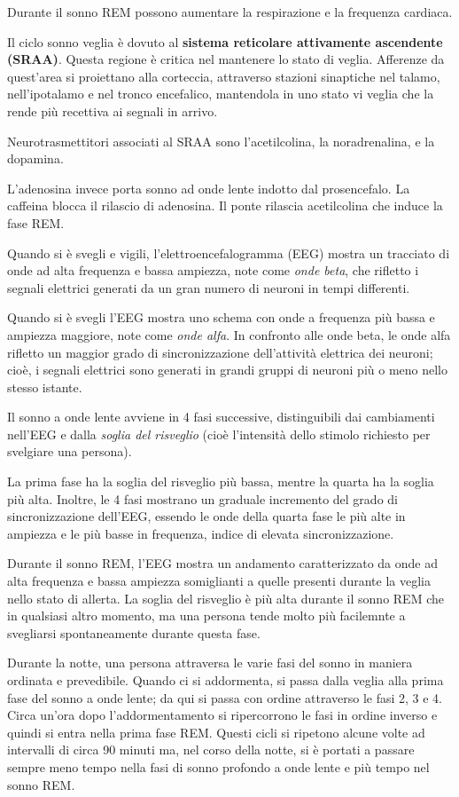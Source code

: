 \documentclass[]{article}
\begin{document}
Durante il sonno REM possono aumentare la respirazione e la frequenza
cardiaca.

Il ciclo sonno veglia è dovuto al \textbf{sistema reticolare attivamente
ascendente (SRAA)}. Questa regione è critica nel mantenere lo stato di
veglia. Afferenze da quest'area si proiettano alla corteccia, attraverso
stazioni sinaptiche nel talamo, nell'ipotalamo e nel tronco encefalico,
mantendola in uno stato vi veglia che la rende più recettiva ai segnali
in arrivo.

Neurotrasmettitori associati al SRAA sono l'acetilcolina, la
noradrenalina, e la dopamina.

L'adenosina invece porta sonno ad onde lente indotto dal prosencefalo.
La caffeina blocca il rilascio di adenosina. Il ponte rilascia
acetilcolina che induce la fase REM.

Quando si è svegli e vigili, l'elettroencefalogramma (EEG) mostra un
tracciato di onde ad alta frequenza e bassa ampiezza, note come
\emph{onde beta}, che rifletto i segnali elettrici generati da un gran
numero di neuroni in tempi differenti.

Quando si è svegli l'EEG mostra uno schema con onde a frequenza più
bassa e ampiezza maggiore, note come \emph{onde alfa}. In confronto alle
onde beta, le onde alfa rifletto un maggior grado di sincronizzazione
dell'attività elettrica dei neuroni; cioè, i segnali elettrici sono
generati in grandi gruppi di neuroni più o meno nello stesso istante.

Il sonno a onde lente avviene in 4 fasi successive, distinguibili dai
cambiamenti nell'EEG e dalla \emph{soglia del risveglio} (cioè
l'intensità dello stimolo richiesto per svelgiare una persona).

La prima fase ha la soglia del risveglio più bassa, mentre la quarta ha
la soglia più alta. Inoltre, le 4 fasi mostrano un graduale incremento
del grado di sincronizzazione dell'EEG, essendo le onde della quarta
fase le più alte in ampiezza e le più basse in frequenza, indice di
elevata sincronizzazione.

Durante il sonno REM, l'EEG mostra un andamento caratterizzato da onde
ad alta frequenza e bassa ampiezza somiglianti a quelle presenti durante
la veglia nello stato di allerta. La soglia del risveglio è più alta
durante il sonno REM che in qualsiasi altro momento, ma una persona
tende molto più facilemnte a svegliarsi spontaneamente durante questa
fase.

Durante la notte, una persona attraversa le varie fasi del sonno in
maniera ordinata e prevedibile. Quando ci si addormenta, si passa dalla
veglia alla prima fase del sonno a onde lente; da qui si passa con
ordine attraverso le fasi 2, 3 e 4. Circa un'ora dopo l'addormentamento
si ripercorrono le fasi in ordine inverso e quindi si entra nella prima
fase REM. Questi cicli si ripetono alcune volte ad intervalli di circa
90 minuti ma, nel corso della notte, si è portati a passare sempre meno
tempo nella fasi di sonno profondo a onde lente e più tempo nel sonno
REM.
\end{document}
